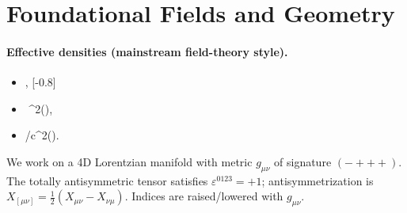 \section{Foundational Fields and Geometry}
\paragraph{Effective densities (mainstream field-theory style).}
\begin{itemize}
    \item \rhof \equiv {}, [-0.8]
    \item \rhoE \equiv {}\,\rhof\,\vnorm^{2}\quad(),
    \item \rhom \equiv \rhoE/c^{2}\quad().
\end{itemize}


We work on a 4D Lorentzian manifold with metric \(g_{\mu\nu}\) of signature \((-+++)\). The totally antisymmetric tensor satisfies \(\varepsilon^{0123}=+1\); antisymmetrization is \(X_{[\mu\nu]}=\tfrac12(X_{\mu\nu}-X_{\nu\mu})\). Indices are raised/lowered with \(g_{\mu\nu}\).

